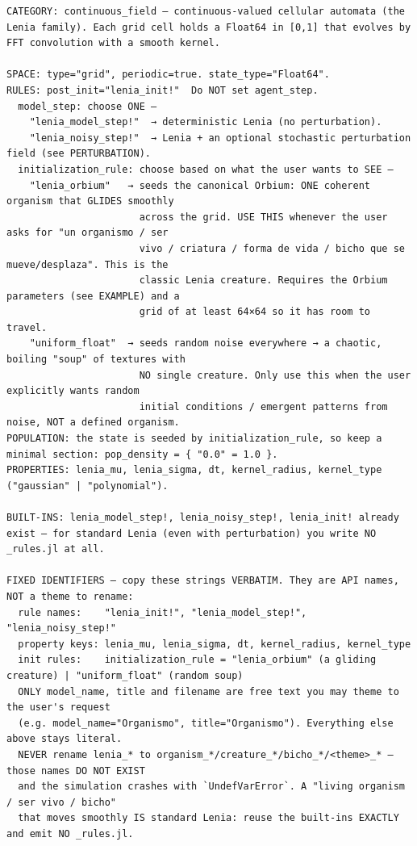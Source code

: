 \documentclass[runningheads]{llncs}
\begin{document}
\begin{lstlisting}[style=cellprompt]
CATEGORY: continuous_field — continuous-valued cellular automata (the Lenia family). Each grid cell holds a Float64 in [0,1] that evolves by FFT convolution with a smooth kernel.

SPACE: type="grid", periodic=true. state_type="Float64".
RULES: post_init="lenia_init!"  Do NOT set agent_step.
  model_step: choose ONE —
    "lenia_model_step!"  → deterministic Lenia (no perturbation).
    "lenia_noisy_step!"  → Lenia + an optional stochastic perturbation field (see PERTURBATION).
  initialization_rule: choose based on what the user wants to SEE —
    "lenia_orbium"   → seeds the canonical Orbium: ONE coherent organism that GLIDES smoothly
                       across the grid. USE THIS whenever the user asks for "un organismo / ser
                       vivo / criatura / forma de vida / bicho que se mueve/desplaza". This is the
                       classic Lenia creature. Requires the Orbium parameters (see EXAMPLE) and a
                       grid of at least 64×64 so it has room to travel.
    "uniform_float"  → seeds random noise everywhere → a chaotic, boiling "soup" of textures with
                       NO single creature. Only use this when the user explicitly wants random
                       initial conditions / emergent patterns from noise, NOT a defined organism.
POPULATION: the state is seeded by initialization_rule, so keep a minimal section: pop_density = { "0.0" = 1.0 }.
PROPERTIES: lenia_mu, lenia_sigma, dt, kernel_radius, kernel_type ("gaussian" | "polynomial").

BUILT-INS: lenia_model_step!, lenia_noisy_step!, lenia_init! already exist — for standard Lenia (even with perturbation) you write NO _rules.jl at all.

FIXED IDENTIFIERS — copy these strings VERBATIM. They are API names, NOT a theme to rename:
  rule names:    "lenia_init!", "lenia_model_step!", "lenia_noisy_step!"
  property keys: lenia_mu, lenia_sigma, dt, kernel_radius, kernel_type
  init rules:    initialization_rule = "lenia_orbium" (a gliding creature) | "uniform_float" (random soup)
  ONLY model_name, title and filename are free text you may theme to the user's request
  (e.g. model_name="Organismo", title="Organismo"). Everything else above stays literal.
  NEVER rename lenia_* to organism_*/creature_*/bicho_*/<theme>_* — those names DO NOT EXIST
  and the simulation crashes with `UndefVarError`. A "living organism / ser vivo / bicho"
  that moves smoothly IS standard Lenia: reuse the built-ins EXACTLY and emit NO _rules.jl.


\end{lstlisting}
\end{document}
